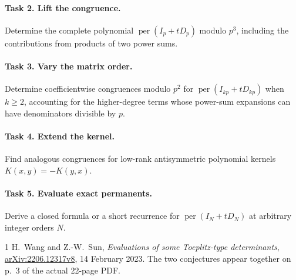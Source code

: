 \documentclass[10pt]{article}
\newcommand{\per}{\operatorname{per}}
\begin{document}
\paragraph{Task 2. Lift the congruence.}
Determine the complete polynomial \(\per(I_p+tD_p)\) modulo \(p^3\),
including the contributions from products of two power sums.

\paragraph{Task 3. Vary the matrix order.}
Determine coefficientwise congruences modulo \(p^2\) for
\(\per(I_{kp}+tD_{kp})\) when \(k\ge2\), accounting for the
higher-degree terms whose power-sum expansions can have denominators
divisible by \(p\).

\paragraph{Task 4. Extend the kernel.}
Find analogous congruences for low-rank antisymmetric polynomial
kernels \(K(x,y)=-K(y,x)\).

\paragraph{Task 5. Evaluate exact permanents.}
Derive a closed formula or a short recurrence for
\(\per(I_N+tD_N)\) at arbitrary integer orders \(N\).

\begin{thebibliography}{1}
 H.~Wang and Z.-W.~Sun,
\emph{Evaluations of some Toeplitz-type determinants},
\href{https://arxiv.org/abs/2206.12317}{arXiv:2206.12317v8},
14 February 2023. The two conjectures appear together on p.~3
of the actual 22-page PDF.
\end{thebibliography}
\end{document}
